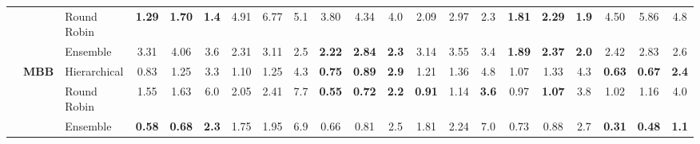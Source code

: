 \documentclass{ieeeaccess}
\begin{document}
{\begin{longtable}{@{\extracolsep{\fill}}lllccc|ccc|ccc|ccc|ccc|ccc}
 &  & Round Robin & \cellcolor{colorrr}\textbf{1.29} & \cellcolor{colorrr}\textbf{1.70} & \cellcolor{colorrr}\textbf{1.4} & 4.91 & 6.77 & 5.1 & 3.80 & 4.34 & 4.0 & 2.09 & 2.97 & 2.3 & \cellcolor{colorrr}\textbf{1.81} & \cellcolor{colorrr}\textbf{2.29} & \cellcolor{colorrr}\textbf{1.9} & 4.50 & 5.86 & 4.8 \\
 &  & Ensemble & 3.31 & 4.06 & 3.6 & \cellcolor{colorens}2.31 & \cellcolor{colorens}3.11 & \cellcolor{colorens}2.5 & \cellcolor{colorens}\textbf{2.22} & \cellcolor{colorens}\textbf{2.84} & \cellcolor{colorens}\textbf{2.3} & 3.14 & 3.55 & 3.4 & \textbf{1.89} & \textbf{2.37} & \textbf{2.0} & \cellcolor{colorens}2.42 & \cellcolor{colorens}2.83 & \cellcolor{colorens}2.6 \\
\cmidrule(lr){2-21}
 & \multirow{3}{*}{\textbf{MBB}} & Hierarchical & 0.83 & 1.25 & 3.3 & \cellcolor{colorhier}1.10 & \cellcolor{colorhier}1.25 & \cellcolor{colorhier}4.3 & \textbf{0.75} & \textbf{0.89} & \textbf{2.9} & 1.21 & 1.36 & 4.8 & 1.07 & 1.33 & 4.3 & \textbf{0.63} & \textbf{0.67} & \textbf{2.4} \\
 &  & Round Robin & 1.55 & 1.63 & 6.0 & 2.05 & 2.41 & 7.7 & \cellcolor{colorrr}\textbf{0.55} & \cellcolor{colorrr}\textbf{0.72} & \cellcolor{colorrr}\textbf{2.2} & \cellcolor{colorrr}\textbf{0.91} & \cellcolor{colorrr}1.14 & \cellcolor{colorrr}\textbf{3.6} & 0.97 & \textbf{1.07} & 3.8 & 1.02 & 1.16 & 4.0 \\
 &  & Ensemble & \cellcolor{colorens}\textbf{0.58} & \cellcolor{colorens}\textbf{0.68} & \cellcolor{colorens}\textbf{2.3} & 1.75 & 1.95 & 6.9 & 0.66 & 0.81 & 2.5 & 1.81 & 2.24 & 7.0 & \cellcolor{colorens}0.73 & \cellcolor{colorens}0.88 & \cellcolor{colorens}2.7 & \cellcolor{colorens}\textbf{0.31} & \cellcolor{colorens}\textbf{0.48} & \cellcolor{colorens}\textbf{1.1} \\
\midrule


\end{longtable}}
\end{document}
